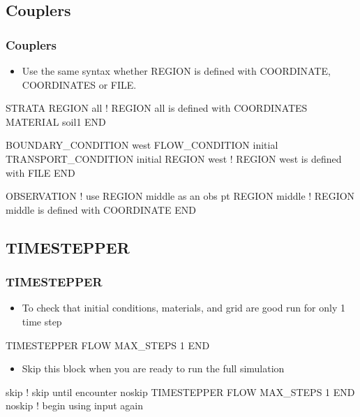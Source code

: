 \documentclass{beamer}
\newcommand\bluecomment[1]{{{\color{blue} #1}}}
\newcommand\greencomment[1]{{{\color{green} #1}}}
\begin{document}
\subsection{Couplers}

\begin{frame}[fragile]\frametitle{Couplers}

\begin{itemize}
\item Use the same syntax whether REGION is defined with COORDINATE, COORDINATES or FILE.
\end{itemize}

\begin{semiverbatim}

STRATA
  REGION all \bluecomment{! REGION \greencomment{all} is defined with COORDINATES}
  MATERIAL soil1
END

BOUNDARY_CONDITION west
  FLOW_CONDITION initial
  TRANSPORT_CONDITION initial
  REGION west \bluecomment{! REGION \greencomment{west} is defined with FILE}
END

OBSERVATION \bluecomment{! use REGION \greencomment{middle} as an obs pt}
  REGION middle \bluecomment{! REGION \greencomment{middle} is defined with COORDINATE}
END
\end{semiverbatim}

\end{frame}

\subsection{TIMESTEPPER}

\begin{frame}[fragile]\frametitle{TIMESTEPPER}

\begin{itemize}
\item To check that initial conditions, materials, and grid are good run for only 1 time step
\end{itemize}

\begin{semiverbatim}

TIMESTEPPER FLOW
  MAX_STEPS 1
END
\end{semiverbatim}

\begin{itemize}
\item Skip this block when you are ready to run the full simulation
\end{itemize}

\begin{semiverbatim}

skip \bluecomment{! \greencomment{skip} until encounter \greencomment{noskip}}
TIMESTEPPER FLOW
  MAX_STEPS 1
END
noskip \bluecomment{! begin using input again}
\end{semiverbatim}

\end{frame}

\end{document}
